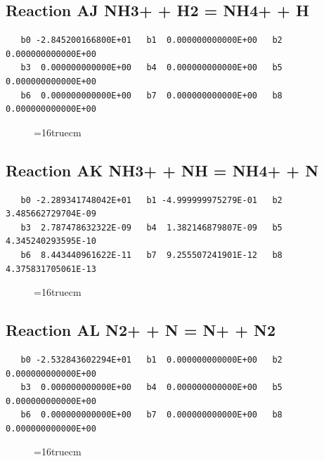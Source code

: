 \documentclass[12pt,dvipdfm]{article}
\begin{document}
\subsection{
Reaction AJ NH3+ + H2 = NH4+ + H }
\begin{small}\begin{verbatim}
   b0 -2.845200166800E+01   b1  0.000000000000E+00   b2  0.000000000000E+00
   b3  0.000000000000E+00   b4  0.000000000000E+00   b5  0.000000000000E+00
   b6  0.000000000000E+00   b7  0.000000000000E+00   b8  0.000000000000E+00
\end{verbatim}\end{small}
\begin{figure}[h!] \label{n2rates}
\epsfxsize=16truecm
\end{figure}
\newpage

\subsection{
Reaction AK NH3+ + NH = NH4+ + N }
\begin{small}\begin{verbatim}
   b0 -2.289341748042E+01   b1 -4.999999975279E-01   b2  3.485662729704E-09
   b3  2.787478632322E-09   b4  1.382146879807E-09   b5  4.345240293595E-10
   b6  8.443440961622E-11   b7  9.255507241901E-12   b8  4.375831705061E-13
\end{verbatim}\end{small}
\begin{figure}[h!] \label{n2rates}
\epsfxsize=16truecm
\end{figure}
\newpage

\subsection{
Reaction AL N2+ + N = N+ + N2 }
\begin{small}\begin{verbatim}
   b0 -2.532843602294E+01   b1  0.000000000000E+00   b2  0.000000000000E+00
   b3  0.000000000000E+00   b4  0.000000000000E+00   b5  0.000000000000E+00
   b6  0.000000000000E+00   b7  0.000000000000E+00   b8  0.000000000000E+00
\end{verbatim}\end{small}
\begin{figure}[h!] \label{n2rates}
\epsfxsize=16truecm
\end{figure}
\newpage
\end{document}
